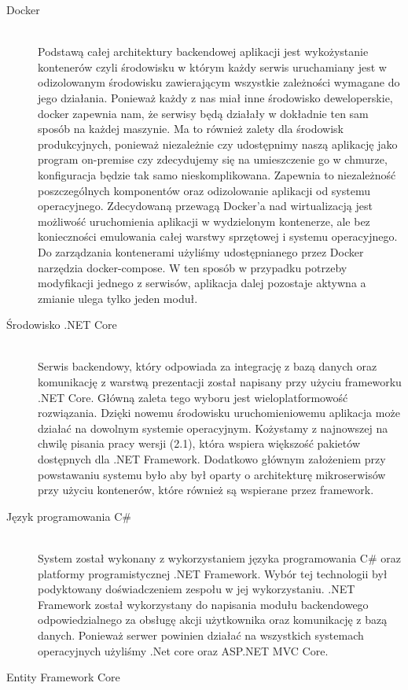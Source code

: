 \documentclass[a4paper,11pt,twoside]{report}
\theoremstyle{definition}
\begin{document}
\begin{description}
\item [Docker] \hfill \\
Podstawą całej architektury backendowej aplikacji jest wykożystanie kontenerów czyli środowisku w którym każdy serwis uruchamiany jest w odizolowanym środowisku zawierającym wszystkie zależności wymagane do jego działania. Ponieważ każdy z nas miał inne środowisko deweloperskie, docker zapewnia nam, że serwisy będą działały w dokładnie ten sam sposób na każdej maszynie. Ma to również zalety dla środowisk produkcyjnych, ponieważ niezależnie czy udostępnimy naszą aplikację jako program on-premise czy zdecydujemy się na umieszczenie go w chmurze, konfiguracja będzie tak samo nieskomplikowana. Zapewnia to niezależność poszczególnych komponentów oraz odizolowanie aplikacji od systemu operacyjnego. Zdecydowaną przewagą Docker’a nad wirtualizacją jest możliwość uruchomienia aplikacji w wydzielonym kontenerze, ale bez konieczności emulowania całej warstwy sprzętowej i systemu operacyjnego. Do zarządzania kontenerami użyliśmy udostępnianego przez Docker narzędzia docker-compose. W ten sposób w przypadku potrzeby modyfikacji jednego z serwisów, aplikacja dalej pozostaje aktywna a zmianie ulega tylko jeden moduł.
\item [Środowisko .NET Core] \hfill \\
Serwis backendowy, który odpowiada za integrację z bazą danych oraz komunikację z warstwą prezentacji został napisany przy użyciu frameworku .NET Core. Główną zaleta tego wyboru jest wieloplatformowość rozwiązania. Dzięki nowemu środowisku uruchomieniowemu aplikacja może działać na dowolnym systemie operacyjnym. Kożystamy z najnowszej na chwilę pisania pracy wersji (2.1), która wspiera większość pakietów dostępnych dla .NET Framework. Dodatkowo głównym założeniem przy powstawaniu systemu było aby był oparty o architekturę mikroserwisów przy użyciu kontenerów, które również są wspierane przez framework.
\item [Język programowania C\# ] \hfill \\
System został wykonany z wykorzystaniem języka programowania C\# oraz platformy programistycznej .NET Framework. Wybór tej technologii był podyktowany doświadczeniem zespołu w jej wykorzystaniu. .NET Framework został wykorzystany do napisania modułu backendowego odpowiedzialnego za obsługę akcji użytkownika oraz komunikację z bazą danych. Ponieważ serwer powinien działać na wszystkich systemach operacyjnych użyliśmy .Net core oraz ASP.NET MVC Core.
\item [Entity Framework Core] \hfill \\

\end{description}
\end{document}
